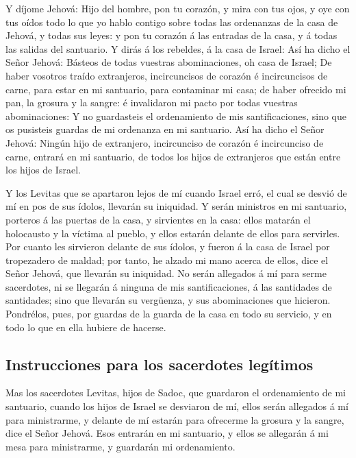  Y díjome Jehová: Hijo del hombre, pon tu corazón, y mira
con tus ojos, y oye con tus oídos todo lo que yo hablo contigo sobre
todas las ordenanzas de la casa de Jehová, y todas sus leyes: y pon tu
corazón á las entradas de la casa, y á todas las salidas del santuario.
 Y dirás á los rebeldes, á la casa de Israel: Así ha dicho
el Señor Jehová: Básteos de todas vuestras abominaciones, oh casa de
Israel;  De haber vosotros traído extranjeros,
incircuncisos de corazón é incircuncisos de carne, para estar en mi
santuario, para contaminar mi casa; de haber ofrecido mi pan, la grosura
y la sangre: é invalidaron mi pacto por todas vuestras abominaciones:
 Y no guardasteis el ordenamiento de mis santificaciones,
sino que os pusisteis guardas de mi ordenanza en mi santuario.
 Así ha dicho el Señor Jehová: Ningún hijo de extranjero,
incircunciso de corazón é incircunciso de carne, entrará en mi
santuario, de todos los hijos de extranjeros que están entre los hijos
de Israel.

 Y los Levitas que se apartaron lejos de mí cuando Israel
erró, el cual se desvió de mí en pos de sus ídolos, llevarán su
iniquidad.  Y serán ministros en mi santuario, porteros á
las puertas de la casa, y sirvientes en la casa: ellos matarán el
holocausto y la víctima al pueblo, y ellos estarán delante de ellos para
servirles.  Por cuanto les sirvieron delante de sus
ídolos, y fueron á la casa de Israel por tropezadero de maldad; por
tanto, he alzado mi mano acerca de ellos, dice el Señor Jehová, que
llevarán su iniquidad.  No serán allegados á mí para
serme sacerdotes, ni se llegarán á ninguna de mis santificaciones, á las
santidades de santidades; sino que llevarán su vergüenza, y sus
abominaciones que hicieron.  Pondrélos, pues, por guardas
de la guarda de la casa en todo su servicio, y en todo lo que en ella
hubiere de hacerse.

\hypertarget{instrucciones-para-los-sacerdotes-leguxedtimos}{%
\subsection{Instrucciones para los sacerdotes
legítimos}\label{instrucciones-para-los-sacerdotes-leguxedtimos}}

 Mas los sacerdotes Levitas, hijos de Sadoc, que
guardaron el ordenamiento de mi santuario, cuando los hijos de Israel se
desviaron de mí, ellos serán allegados á mí para ministrarme, y delante
de mí estarán para ofrecerme la grosura y la sangre, dice el Señor
Jehová.  Esos entrarán en mi santuario, y ellos se
allegarán á mi mesa para ministrarme, y guardarán mi ordenamiento.

